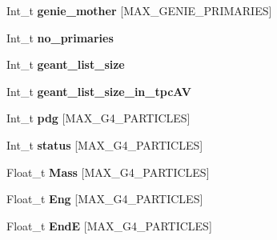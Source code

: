 \begin{DoxyCompactItemize}
\item 
\hypertarget{classanatree_a8e1f5074bd06e73c1c4bbdd9fd9bb129}{Int\-\_\-t {\bfseries genie\-\_\-mother} \mbox{[}M\-A\-X\-\_\-\-G\-E\-N\-I\-E\-\_\-\-P\-R\-I\-M\-A\-R\-I\-E\-S\mbox{]}}\label{classanatree_a8e1f5074bd06e73c1c4bbdd9fd9bb129}

\item 
\hypertarget{classanatree_a76c6d8514cd78c8dd50ce0334e1c4d0b}{Int\-\_\-t {\bfseries no\-\_\-primaries}}\label{classanatree_a76c6d8514cd78c8dd50ce0334e1c4d0b}

\item 
\hypertarget{classanatree_a455af43b0d2a4febeb56b786b5ffa084}{Int\-\_\-t {\bfseries geant\-\_\-list\-\_\-size}}\label{classanatree_a455af43b0d2a4febeb56b786b5ffa084}

\item 
\hypertarget{classanatree_acca0dc16c2c962a20caff12197e3345d}{Int\-\_\-t {\bfseries geant\-\_\-list\-\_\-size\-\_\-in\-\_\-tpc\-A\-V}}\label{classanatree_acca0dc16c2c962a20caff12197e3345d}

\item 
\hypertarget{classanatree_a309376b30f569539cf8a46be0fd3330e}{Int\-\_\-t {\bfseries pdg} \mbox{[}M\-A\-X\-\_\-\-G4\-\_\-\-P\-A\-R\-T\-I\-C\-L\-E\-S\mbox{]}}\label{classanatree_a309376b30f569539cf8a46be0fd3330e}

\item 
\hypertarget{classanatree_a09a0173443fb9f8fe2991367ff7ed973}{Int\-\_\-t {\bfseries status} \mbox{[}M\-A\-X\-\_\-\-G4\-\_\-\-P\-A\-R\-T\-I\-C\-L\-E\-S\mbox{]}}\label{classanatree_a09a0173443fb9f8fe2991367ff7ed973}

\item 
\hypertarget{classanatree_a6acdd2c8c51383e29eab40fa56464b0c}{Float\-\_\-t {\bfseries Mass} \mbox{[}M\-A\-X\-\_\-\-G4\-\_\-\-P\-A\-R\-T\-I\-C\-L\-E\-S\mbox{]}}\label{classanatree_a6acdd2c8c51383e29eab40fa56464b0c}

\item 
\hypertarget{classanatree_a09524750f273198e0a44997bbfea3b7a}{Float\-\_\-t {\bfseries Eng} \mbox{[}M\-A\-X\-\_\-\-G4\-\_\-\-P\-A\-R\-T\-I\-C\-L\-E\-S\mbox{]}}\label{classanatree_a09524750f273198e0a44997bbfea3b7a}

\item 
\hypertarget{classanatree_a7c87aaf34c469a1bb405c859379ce971}{Float\-\_\-t {\bfseries End\-E} \mbox{[}M\-A\-X\-\_\-\-G4\-\_\-\-P\-A\-R\-T\-I\-C\-L\-E\-S\mbox{]}}\label{classanatree_a7c87aaf34c469a1bb405c859379ce971}


\end{DoxyCompactItemize}
